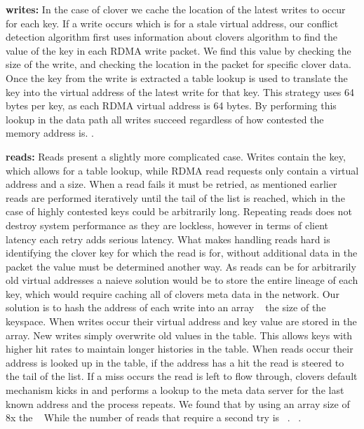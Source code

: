 \textbf{writes:} In the case of clover we cache the location of the latest writes to occur for
each key. If a write occurs which is for a stale virtual address, our conflict
detection algorithm first uses information about clovers algorithm to find the
value of the key in each RDMA write packet. We find this value by checking the
size of the write, and checking the location in the packet for specific clover
data. Once the key from the write is extracted a table lookup is used to
translate the key into the virtual address of the latest write for that key.
This strategy uses 64 bytes per key, as each RDMA virtual address is 64 bytes.
By performing this lookup in the data path all writes succeed regardless of how
contested the memory address is. .

\textbf{reads:} Reads present a slightly more complicated case. Writes contain
the key, which allows for a table lookup, while RDMA read requests only contain
a virtual address and a size. When a read fails it must be retried, as mentioned
earlier reads are performed iteratively until the tail of the list is reached,
which in the case of highly contested keys could be arbitrarily long. Repeating
reads does not destroy system performance as they are lockless, however in terms
of client latency each retry adds serious latency. What makes handling reads
hard is identifying the clover key for which the read is for, without additional
data in the packet the value must be determined another way. As reads can be for
arbitrarily old virtual addresses a naieve solution would be to store the entire
lineage of each key, which would require caching all of clovers meta data in the
network. Our solution is to hash the address of each write into an array
~ the size of the keyspace. When writes occur their virtual address and
key value are stored in the array. New writes simply overwrite old values in the
table. This allows keys with higher hit rates to maintain longer histories in
the table. When reads occur their address is looked up in the table, if the
address has a hit the read is steered to the tail of the list. If a miss occurs
the read is left to flow through, clovers default mechanism kicks in and
performs a lookup to the meta data server for the last known address and the
process repeats. We found that by using an array size of 8x the ~ While the number of reads that require a
second try is ~. ~.


